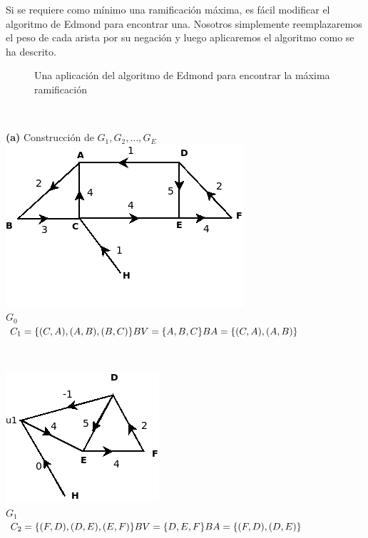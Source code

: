 \documentclass[10pt,a5paper]{book}
\begin{document}
Si se requiere como mínimo una ramificación máxima, es fácil modificar el algoritmo de Edmond para encontrar una. Nosotros simplemente reemplazaremos el peso de cada arista por su negación y luego aplicaremos el algoritmo como se ha descrito.
\begin{figure}[H]
\caption{Una aplicación del algoritmo de Edmond para encontrar la máxima ramificación}
\end{figure}
\vfill
\hrulefill{}\\
\parbox{6cm}
  {
    \textbf{(a)} Construcción de $G_1, G_2, \ldots, G_E$ \\
    \hspace*{.5in}\includegraphics[scale=0.6]{Fig2_4_a1.png}\\
      \hspace*{1.5in}\textbf{$G_0$}\\
      
      $C_1 = \{(C,A),(A,B),(B,C)\}\\
      BV = \{A,B,C\}\\
      BA = \{(C,A),(A,B)\}$ \\
    }\hfill\\
  \parbox{6cm}
  {
    \hspace*{-.5in}\includegraphics[scale=0.6]{Fig2_4_a2.png}\\
    \hspace*{.25in}\textbf{$G_1$}\\
    
    $C_2 = \{(F,D), (D,E), (E,F)\}\\
    BV = \{D,E,F\}\\
    BA = \{(F,D),(D,E)\}$ \\
  }\hfill
\end{document}
